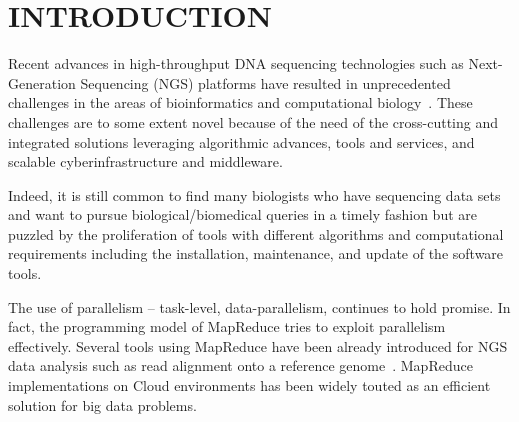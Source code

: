 \documentclass{acm_proc_article-sp}
\begin{document}
 








\section{INTRODUCTION} 

Recent advances in high-throughput DNA sequencing technologies such as
Next-Generation Sequencing (NGS) platforms have resulted in
unprecedented challenges in the areas of bioinformatics and
computational
biology~\cite{metzker2010,1000genome,wang2009-natrevgen,alex2009,mcpherson2009}.
These challenges are to some extent novel because of the need of the
cross-cutting and integrated solutions leveraging algorithmic
advances, tools and services, and scalable cyberinfrastructure and
middleware.

Indeed, it is still common to find many biologists who have sequencing
data sets and want to pursue biological/biomedical queries in a
timely fashion but are puzzled by the proliferation of tools with
different algorithms and computational requirements including the
installation, maintenance, and update of the software tools.

The use of parallelism -- task-level, data-parallelism, continues to
hold promise. In fact, the programming model of MapReduce tries to
exploit parallelism effectively.  Several tools using MapReduce have
been already introduced for NGS data analysis such as read alignment
onto a reference genome~\cite{cloudburst,
  gatk,langmead2009,seal2011,langmead2010, taylor2010}.  MapReduce
implementations on Cloud environments has been widely touted as an
efficient solution for big data
problems\cite{mapreduce-2004-dean,schatz-nature-biotech-2010,
  taylor2010}.
\end{document}
